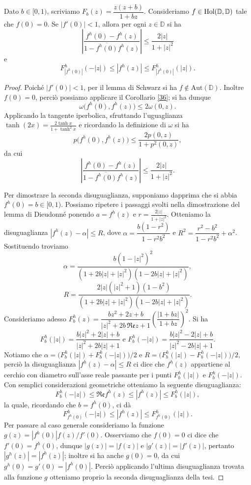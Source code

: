 \begin{thm} \label{distortion}
  Dato $b \in [0,1)$, scriviamo $F_b(z)=\dfrac{z(z+b)}{1+b z}$. Consideriamo $f \in \normalfont{\text{Hol}}(\mathbb{D},\mathbb{D})$ tale che $f(0)=0$. Se $|f'(0)|<1$, allora per ogni $z \in \mathbb{D}$ si ha
  \begin{equation}
    \left|\frac{f^h(0)-f^h(z)}{1-\overline{f^h(0)}f^h(z)}\right| \le \frac{2|z|}{1+|z|^2}
  \end{equation}
  e
  \begin{equation}
    F_{|f^h(0)|}^h(-|z|) \le |f^h(z)| \le F_{|f^h(0)|}^h(|z|).
  \end{equation}
\end{thm}

\begin{proof}
  Poiché $|f'(0)|<1$, per il lemma di Schwarz si ha $f \not\in \text{Aut}(\mathbb{D})$. Inoltre $f(0)=0$, perciò possiamo applicare il Corollario \ref{36}; si ha dunque
  $$\omega\bigl(f^h(0),f^h(z)\bigr) \le 2\omega(0,z).$$
  Applicando la tangente iperbolica, sfruttando l'uguaglianza $\tanh(2x)=\frac{2\tanh{x}}{1+\tanh^2{x}}$ e ricordando la definizione di $\omega$ si ha
  $$p\bigl(f^h(0),f^h(z)\bigr) \le \frac{2p(0,z)}{1+p^2(0,z)},$$
  da cui
  $$\left|\frac{f^h(0)-f^h(z)}{1-\overline{f^h(0)}f^h(z)}\right| \le \frac{2|z|}{1+|z|^2}.$$

  Per dimostrare la seconda disuguaglianza, supponiamo dapprima che si abbia $f^h(0)=b \in [0,1)$. Possiamo ripetere i passaggi svolti nella dimostrazione del lemma di Dieudonné ponendo $a=f^h(z)$ e $r=\frac{2|z|}{1+|z|^2}$. Otteniamo la disuguaglianza $|f^h(z)-\alpha| \le R$, dove $\alpha=\dfrac{b(1-r^2)}{1-r^2b^2}$ e $R^2=\dfrac{r^2-b^2}{1-r^2b^2}+\alpha^2$. Sostituendo troviamo
  $$\alpha=\frac{b(1-|z|^2)^2}{(1+2b|z|+|z|^2)(1-2b|z|+|z|^2)},$$
  $$R=\frac{2|z|(|z|^2+1)(1-b^2)}{(1+2b|z|+|z|^2)(1-2b|z|+|z|^2)}.$$
  Consideriamo adesso $F_b^h(z)=\dfrac{bz^2+2z+b}{|z|^2+2b\,\mathfrak{Re}z+1}\left(\dfrac{|1+b z|}{1+b z}\right)^2$. Si ha
  $$F_b^h(|z|)=\dfrac{b|z|^2+2|z|+b}{|z|^2+2b|z|+1} \text{ e } F_b^h(-|z|)=\dfrac{b|z|^2-2|z|+b}{|z|^2-2b|z|+1}.$$
  Notiamo che $\alpha=\bigl(F_b^h(|z|)+F_b^h(-|z|)\bigr)/2$ e $R=\bigl(F_b^h(|z|)-F_b^h(-|z|)\bigr)/2$, perciò la disuguaglianza $|f^h(z)-\alpha| \le R$ ci dice che $f^h(z)$ appartiene al cerchio con diametro sull'asse reale passante per i punti $F_b^h(|z|)$ e $F_b^h(-|z|)$. Con semplici considerazioni geometriche otteniamo la seguente disuguaglianza:
  $$F_b^h(-|z|) \le \mathfrak{Re}f^h(z) \le |f^h(z)| \le F_b^h(|z|),$$
  la quale, ricordando che $b=f^h(0)$, ci dà
  $$F_{f^h(0)}^h(-|z|) \le |f^h(z)| \le F_{f^h(0)}^h(|z|).$$
  Per passare al caso generale consideriamo la funzione $g(z)=|f^h(0)|f(z)/f'(0)$. Osserviamo che $f(0)=0$ ci dice che $f'(0)=f^h(0)$, dunque $|g(z)|=|f(z)|$ e $|g'(z)|=|f'(z)|$, pertanto $|g^h(z)|=|f^h(z)|$; inoltre si ha anche $g(0)=0$, da cui $g^h(0)=g'(0)=|f^h(0)|$. Perciò applicando l'ultima disuguaglianza trovata alla funzione $g$ otteniamo proprio la seconda disuguaglianza della tesi.
\end{proof}

